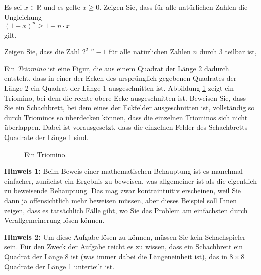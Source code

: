  
\exercise
Es sei $x \in \mathbb{R}$ und es gelte $x \geq 0$.  Zeigen Sie, dass f\"{u}r alle nat\"{u}rlichen Zahlen die Ungleichung
\\[0.2cm]
\hspace*{1.3cm}
$(1+x)^{n} \geq 1 + n \cdot x$
\\[0.2cm]
gilt.  
\exend


\exercise 
Zeigen Sie, dass die Zahl $2^{2 \cdot n} - 1$ f\"{u}r alle nat\"{u}rlichen Zahlen $n$ durch $3$
teilbar ist,
\exend 


\exercise
Ein \emph{Triomino} ist eine Figur, die aus einem Quadrat der L\"{a}nge 2 dadurch entsteht, dass in
einer  der Ecken des urspr\"{u}nglich gegebenen Quadrates der L\"{a}nge 2 ein Quadrat der L\"{a}nge 1
ausgeschnitten ist.  Abbildung \ref{fig:triomino.eps} zeigt 
ein Triomino, bei dem die rechte obere Ecke ausgeschnitten ist.  Beweisen Sie, dass Sie ein 
\href{http://de.wikipedia.org/wiki/Schachbrett}{Schachbrett}, bei dem eines der Eckfelder
ausgeschnitten ist, vollst\"{a}ndig so durch Triominos so \"{u}berdecken k\"{o}nnen, dass die einzelnen
Triominos sich nicht \"{u}berlappen.  Dabei ist vorausgesetzt, dass die einzelnen Felder des
Schachbretts Quadrate der L\"{a}nge 1 sind.

\begin{figure}[!ht]
  \centering
  \caption{Ein Triomino.}
  \label{fig:triomino.eps}
\end{figure}

\vspace*{0.2cm}
 
\noindent  
\textbf{Hinweis 1:}  Beim Beweis einer mathematischen Behauptung ist es manchmal einfacher, zun\"{a}chst  
ein  Ergebnis zu beweisen, was allgemeiner ist als die eigentlich zu beweisende Behauptung.  Das mag  
zwar kontraintuitiv erscheinen, weil Sie dann ja offensichtlich mehr beweisen m\"{u}ssen, aber dieses  
Beispiel soll Ihnen zeigen, dass es tats\"{a}chlich F\"{a}lle gibt, wo Sie das Problem am einfachsten durch  
Verallgemeinerung l\"{o}sen k\"{o}nnen.  
\vspace*{0.2cm}

\noindent
\textbf{Hinweis 2:}  Um diese Aufgabe l\"{o}sen zu k\"{o}nnen, m\"{u}ssen Sie kein Schachspieler sein.
F\"{u}r den Zweck der Aufgabe reicht es zu wissen, dass ein Schachbrett ein Quadrat der L\"{a}nge 8 ist (was immer
dabei die L\"{a}ngeneinheit ist), das in $8 \times 8$ Quadrate der L\"{a}nge 1 unterteilt ist.
\exend  

